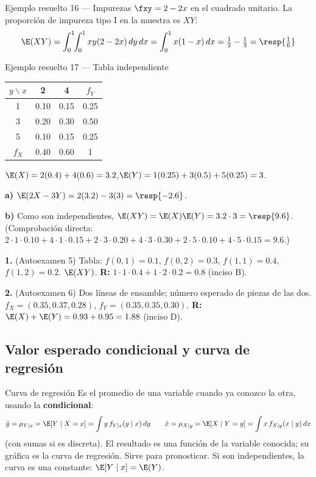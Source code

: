 \begin{ejemplo}{Ejemplo resuelto 16 --- Impurezas }
$\fxy=2-2x$ en el cuadrado unitario. La proporci\'on de impureza tipo I en la muestra es $XY$:
\[
\E(XY)=\int_0^1\!\!\int_0^1xy(2-2x)\,dy\,dx=\int_0^1x(1-x)\,dx=\tfrac12-\tfrac13=\resp{\tfrac16}
\]
\end{ejemplo}

\begin{ejemplo}{Ejemplo resuelto 17 --- Tabla independiente }
\begin{center}
\begin{tabular}{c|cc|c}
$y\backslash x$ & 2 & 4 & $f_Y$\\ \hline
1 & 0.10 & 0.15 & 0.25\\
3 & 0.20 & 0.30 & 0.50\\
5 & 0.10 & 0.15 & 0.25\\ \hline
$f_X$ & 0.40 & 0.60 & 1
\end{tabular}
\end{center}
$\E(X)=2(0.4)+4(0.6)=3.2$,\quad $\E(Y)=1(0.25)+3(0.5)+5(0.25)=3$.

\textbf{a)} $\E(2X-3Y)=2(3.2)-3(3)=\resp{-2.6}$.

\textbf{b)} Como son independientes, $\E(XY)=\E(X)\E(Y)=3.2\cdot3=\resp{9.6}$.
(Comprobaci\'on directa: $2\cdot1\cdot0.10+4\cdot1\cdot0.15+2\cdot3\cdot0.20+4\cdot3\cdot0.30+2\cdot5\cdot0.10+4\cdot5\cdot0.15=9.6$.)
\end{ejemplo}

\begin{mecaniza}
\textbf{1.} (Autoexamen 5) Tabla: $f(0,1)=0.1$, $f(0,2)=0.3$, $f(1,1)=0.4$, $f(1,2)=0.2$. $\E(XY)$.
\quad\textbf{R:} $1\cdot1\cdot0.4+1\cdot2\cdot0.2=0.8$ (inciso B).

\textbf{2.} (Autoexamen 6) Dos l\'ineas de ensamble; n\'umero esperado de piezas de las dos.
$f_X=(0.35,0.37,0.28)$, $f_Y=(0.35,0.35,0.30)$.
\quad\textbf{R:} $\E(X)+\E(Y)=0.93+0.95=1.88$ (inciso D).
\end{mecaniza}

\subsection{Valor esperado condicional y curva de regresi\'on}

\begin{teoria}{Curva de regresi\'on}
Es el promedio de una variable cuando ya conozco la otra, usando la \textbf{condicional}:
\[
\hat y=\mu_{Y\mid x}=\E[Y\mid X=x]=\int y\,f_{Y\mid x}(y\mid x)\,dy
\qquad
\hat x=\mu_{X\mid y}=\E[X\mid Y=y]=\int x\,f_{X\mid y}(x\mid y)\,dx
\]
(con sumas si es discreta). El resultado es una funci\'on de la variable conocida; su gr\'afica es la curva de regresi\'on.
Sirve para pronosticar. Si son independientes, la curva es una constante: $\E[Y\mid x]=\E(Y)$.
\end{teoria}

